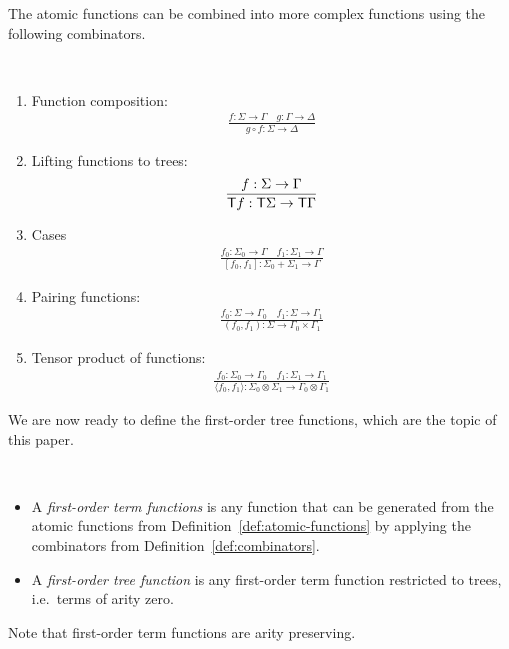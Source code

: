 The atomic functions can be combined into more complex functions using the following combinators.
\begin{definition}
     [Combinators] \label{def:combinators} \ 
    \begin{enumerate}
    \item Function composition:
    \begin{align*}
    \frac{f : \Sigma \to \Gamma \quad g : \Gamma \to \Delta} {g \circ f : \Sigma \to \Delta}
\end{align*}

\item Lifting functions to trees:
\begin{align*}
    \frac{f : \Sigma \to \Gamma} {\mathsf T f : \mathsf T \Sigma \to \mathsf T \Gamma}
\end{align*}
\item Cases
\begin{align*}
    \frac{f_0 : \Sigma_0 \to \Gamma \quad f_1 : \Sigma_1 \to \Gamma} {[f_0,f_1] : \Sigma_0 + \Sigma_1 \to \Gamma}
\end{align*}

\item Pairing functions:
\begin{align*}
    \frac{f_0 : \Sigma \to \Gamma_0 \quad f_1 : \Sigma \to \Gamma_1} {(f_0,f_1) : \Sigma \to \Gamma_0 \times \Gamma_1}
\end{align*}

\item Tensor product of functions:
\begin{align*}
    \frac{f_0 : \Sigma_0 \to \Gamma_0 \quad f_1 : \Sigma_1 \to \Gamma_1} {\langle f_0,f_1 \rangle : \Sigma_0 \otimes \Sigma_1 \to \Gamma_0 \otimes \Gamma_1}
\end{align*}
\end{enumerate}
\end{definition}

We are now ready to define the first-order tree functions, which are the topic of this paper. 

\begin{definition} \label{def:fo-tree-functions} \ 
    \begin{itemize}
        \item A \emph{first-order term functions} is any function that can be  generated from the atomic functions from Definition~\ref{def:atomic-functions} by applying the  combinators from Definition~\ref{def:combinators}.
        \item  A \emph{first-order tree function} is any first-order term function restricted to trees, i.e.~terms of arity zero.
    \end{itemize}    
\end{definition}
Note that first-order term functions are arity preserving. 

